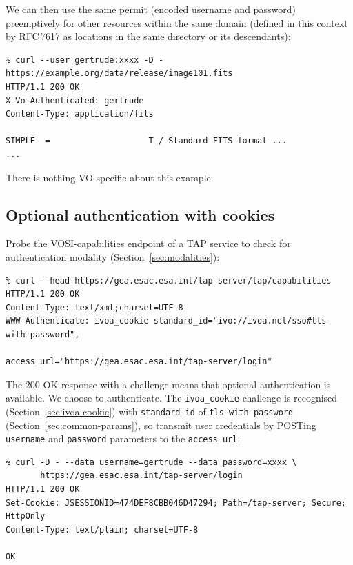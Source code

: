 \documentclass[11pt,a4paper]{ivoa}
\newcommand{\rfc}[1]{RFC\,#1}
\begin{document}
\noindent
We can then use the same permit (encoded username and password)
preemptively for other resources within the same domain
(defined in this context by \rfc{7617} as locations in the same
directory or its descendants):
{\footnotesize
\begin{verbatim}
% curl --user gertrude:xxxx -D - https://example.org/data/release/image101.fits
HTTP/1.1 200 OK
X-Vo-Authenticated: gertrude
Content-Type: application/fits

SIMPLE  =                    T / Standard FITS format ...
...
\end{verbatim}
}

There is nothing VO-specific about this example.


\subsection{Optional authentication with cookies}
\label{sec:cookie-example}


Probe the VOSI-capabilities endpoint of a TAP service to check
for authentication modality (Section~\ref{sec:modalities}):
{\footnotesize
\begin{verbatim}
% curl --head https://gea.esac.esa.int/tap-server/tap/capabilities
HTTP/1.1 200 OK
Content-Type: text/xml;charset=UTF-8
WWW-Authenticate: ivoa_cookie standard_id="ivo://ivoa.net/sso#tls-with-password",
                              access_url="https://gea.esac.esa.int/tap-server/login"
\end{verbatim}
}

\noindent
The 200 OK response with a challenge means that optional authentication
is available.
We choose to authenticate.
The \verb|ivoa_cookie| challenge is recognised (Section~\ref{sec:ivoa-cookie})
with \verb|standard_id| of \verb|tls-with-password|
(Section~\ref{sec:common-params}),
so transmit user credentials
by POSTing \verb|username| and \verb|password| parameters
to the \verb|access_url|:
{\footnotesize
\begin{verbatim}
% curl -D - --data username=gertrude --data password=xxxx \
       https://gea.esac.esa.int/tap-server/login
HTTP/1.1 200 OK
Set-Cookie: JSESSIONID=474DEF8CBB046D47294; Path=/tap-server; Secure; HttpOnly
Content-Type: text/plain; charset=UTF-8

OK
\end{verbatim}
}
\end{document}
